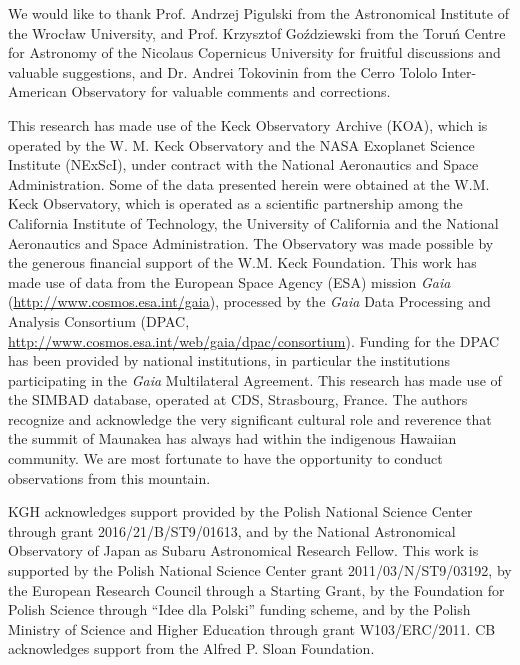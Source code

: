 \documentclass{aa}
\begin{document}
\begin{acknowledgements}
We would like to thank Prof. Andrzej Pigulski from the Astronomical Institute of the 
Wroc{\l}aw University, and Prof. Krzysztof Go\'{z}dziewski from the Toru\'n Centre for 
Astronomy of the Nicolaus Copernicus University for fruitful discussions and valuable 
suggestions, and Dr. Andrei Tokovinin from the Cerro Tololo Inter-American Observatory
for valuable comments and corrections.

This research has made use of the Keck Observatory Archive (KOA), which is 
operated by the W. M. Keck Observatory and the NASA Exoplanet Science Institute (NExScI), 
under contract with the National Aeronautics and Space Administration. Some of the data 
presented herein were obtained at the W.M. Keck Observatory, which is operated as a 
scientific partnership among the California Institute of Technology, the University of 
California and the National Aeronautics and Space Administration. The Observatory was 
made possible by the generous financial support of the W.M. Keck Foundation. 
This work has made use of data from the European Space Agency (ESA)
mission {\it Gaia} (\url{http://www.cosmos.esa.int/gaia}), processed by
the {\it Gaia} Data Processing and Analysis Consortium (DPAC,
\url{http://www.cosmos.esa.int/web/gaia/dpac/consortium}). Funding
for the DPAC has been provided by national institutions, in particular
the institutions participating in the {\it Gaia} Multilateral Agreement.
This research has 
made use of the SIMBAD database, operated at CDS, Strasbourg, France. The authors 
recognize and acknowledge the very significant cultural role and reverence that the summit 
of Maunakea has always had within the indigenous Hawaiian community. We are most 
fortunate to have the opportunity to conduct observations from this mountain.


KGH acknowledges support provided by the Polish National Science Center through grant 2016/21/B/ST9/01613,
and by the National Astronomical Observatory of Japan as Subaru Astronomical Research Fellow. 
This work is supported by the Polish National Science Center grant 2011/03/N/ST9/03192, %
by the European Research Council through a Starting Grant, 
by the Foundation for Polish Science through ``Idee dla Polski'' funding scheme, 
and by the Polish Ministry of Science and Higher Education through grant W103/ERC/2011.
CB acknowledges support from the Alfred P. Sloan Foundation.

\end{acknowledgements}
\end{document}
